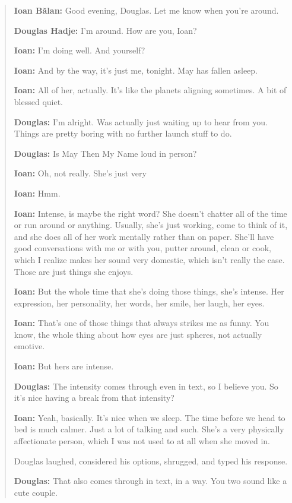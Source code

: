 \begin{quote}
\textbf{Ioan Bălan:} Good evening, Douglas. Let me know when you're around.

\textbf{Douglas Hadje:} I'm around. How are you, Ioan?

\textbf{Ioan:} I'm doing well. And yourself?

\textbf{Ioan:} And by the way, it's just me, tonight. May has fallen asleep.

\textbf{Ioan:} All of her, actually. It's like the planets aligning sometimes. A bit of blessed quiet.

\textbf{Douglas:} I'm alright. Was actually just waiting up to hear from you. Things are pretty boring with no further launch stuff to do.

\textbf{Douglas:} Is May Then My Name loud in person?

\textbf{Ioan:} Oh, not really. She's just very

\textbf{Ioan:} Hmm.

\textbf{Ioan:} Intense, is maybe the right word? She doesn't chatter all of the time or run around or anything. Usually, she's just working, come to think of it, and she does all of her work mentally rather than on paper. She'll have good conversations with me or with you, putter around, clean or cook, which I realize makes her sound very domestic, which isn't really the case. Those are just things she enjoys.

\textbf{Ioan:} But the whole time that she's doing those things, she's intense. Her expression, her personality, her words, her smile, her laugh, her eyes.

\textbf{Ioan:} That's one of those things that always strikes me as funny. You know, the whole thing about how eyes are just spheres, not actually emotive.

\textbf{Ioan:} But hers are intense.

\textbf{Douglas:} The intensity comes through even in text, so I believe you. So it's nice having a break from that intensity?

\textbf{Ioan:} Yeah, basically. It's nice when we sleep. The time before we head to bed is much calmer. Just a lot of talking and such. She's a very physically affectionate person, which I was not used to at all when she moved in.

Douglas laughed, considered his options, shrugged, and typed his response.

\textbf{Douglas:} That also comes through in text, in a way. You two sound like a cute couple.


\end{quote}
